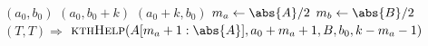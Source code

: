 \documentclass[11pt]{article}
\begin{document}
\begin{algorithmic}
        \State \Return \((a_0,b_0)\)
        \State \Return \((a_0,b_0+k)\)
        \State \Return \((a_0+k,b_0)\)
\Else
        \State \(m_a\gets\abs{A}/2\)
        \State \(m_b\gets\abs{B}/2\)
                \State \((T,T)\Rightarrow\) \Return \(\textsc{kthHelp}(A[m_a+1:\abs{A}],a_0+m_a+1,B,b_0,k-m_a-1)\)
        \EndCaseOf
\EndIf
\EndFunction
\end{algorithmic}
\end{document}
